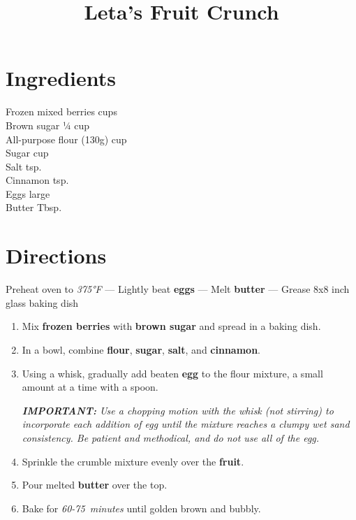 \documentclass[11pt,letterpaper]{article}
\title{Leta's Fruit Crunch}
\author{}
\date{}
\begin{document}
\maketitle
\thispagestyle{empty}

\section*{Ingredients}
\setlength{\columnsep}{20pt}
\begin{multicols}{2}
\noindent
    Frozen mixed berries  cups \\
    Brown sugar \dotfill ¼ cup \\
    All-purpose flour (130g) cup \\
    Sugar  cup \\
    Salt  tsp. \\
    Cinnamon  tsp. \\
    Eggs  large \\
    Butter  Tbsp.
\end{multicols}

\section*{Directions}

\noindent
Preheat oven to \textit{375°F} ---
Lightly beat \textbf{eggs} ---
Melt \textbf{butter} ---
Grease 8x8 inch glass baking dish

\begin{enumerate}
    \item Mix \textbf{frozen berries} with \textbf{brown sugar} and spread in a baking dish.
    
    \item In a bowl, combine \textbf{flour}, \textbf{sugar}, \textbf{salt}, and \textbf{cinnamon}.
    
    \item Using a whisk, gradually add beaten \textbf{egg} to the flour mixture, a small amount at a time with a spoon.
    
    \textit{\textbf{IMPORTANT:} Use a chopping motion with the whisk (not stirring) to incorporate each addition of egg until the mixture reaches a clumpy wet sand consistency. Be patient and methodical, and do not use all of the egg.}
    
    \item Sprinkle the crumble mixture evenly over the \textbf{fruit}.
    
    \item Pour melted \textbf{butter} over the top.
    
    \item Bake for \textit{60-75~minutes} until golden brown and bubbly.
\end{enumerate}
\end{document}
